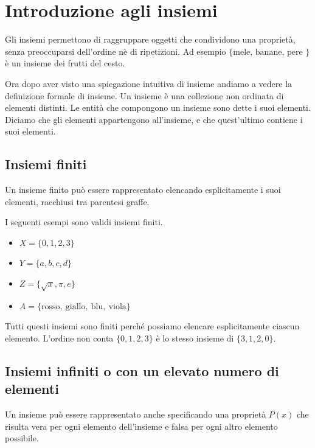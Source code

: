 

\section{Introduzione agli insiemi}

Gli insiemi permettono di raggruppare oggetti che condividono una proprietà, senza preoccuparsi dell'ordine nè di ripetizioni. Ad esempio \( \{\text{mele, banane, pere }\}\) è un insieme dei frutti del cesto. 
\medskip 

Ora dopo aver visto una spiegazione intuitiva di insieme andiamo a vedere la definizione formale di insieme. 
{
Un insieme è una collezione non ordinata di elementi distinti. Le entità che compongono un insieme sono dette i suoi elementi. Diciamo che gli elementi appartengono all'insieme, e che quest'ultimo contiene i suoi elementi.
}
 

\subsection{Insiemi finiti}
 Un insieme finito può essere rappresentato elencando esplicitamente i suoi elementi, racchiusi tra parentesi graffe.

\begin{esempio} I seguenti esempi sono validi insiemi finiti.
    \begin{itemize}
        \item $X=\{0,1,2,3\}$
        \item $Y=\{a,b,c,d\}$
        \item $Z=\{\sqrt{x}, \pi , e\}$
        \item $A=\{\text{rosso}, \ \text{giallo}, \ \text{blu}, \ \text{viola}\}$
    \end{itemize}
    Tutti questi insiemi sono finiti perché possiamo elencare esplicitamente ciascun elemento. L'ordine non conta 
 $\{0,1,2,3\}$ è lo stesso insieme di $\{3,1,2,0\}$.
\end{esempio}
\subsection{Insiemi infiniti o con un elevato numero di elementi}
Un insieme può essere rappresentato anche specificando una proprietà $P(x)$ che risulta vera per ogni elemento dell'insieme e falsa per ogni altro elemento possibile. 

